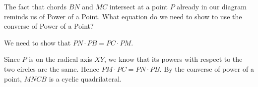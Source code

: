 The fact that chords $BN$ and $MC$ intersect at a point $P$ already in our diagram reminds us of Power of a Point. What equation do we need to show to use the converse of Power of a Point?

















We need to show that $PN\cdot PB = PC\cdot PM$.


Since $P$ is on the radical axis $XY$, we know that its powers with respect to the two circles are the same. Hence $PM\cdot PC = PN\cdot PB$. By the converse of power of a point, $MNCB$ is a cyclic quadrilateral.

